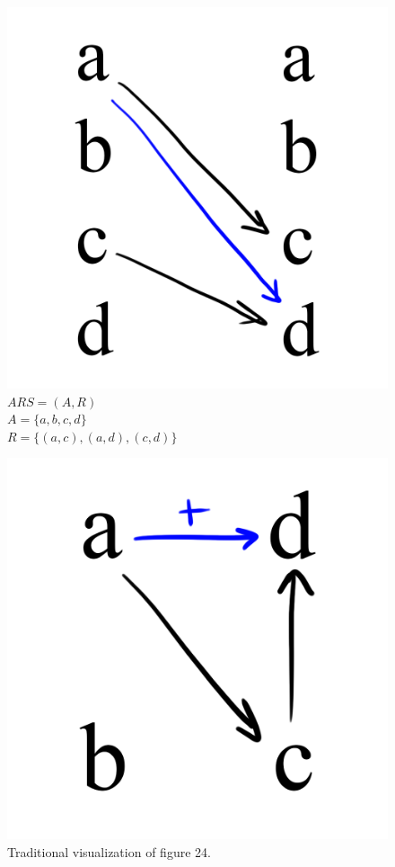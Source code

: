 \documentclass{article}
\begin{document}
\begin{figure}[H]
  \centering
  \includegraphics[scale=0.06]{s5}
  \caption[] {
    $ARS = (A, R)$
    \\ $A = \{a, b, c ,d\}$
    \\ $R = \{(a, c), (a, d), (c, d)\}$
    \endtabular}
\end{figure}

\begin{figure}[H]
  \centering
  \includegraphics[scale=0.06]{v5}
  \caption[] {
    Traditional visualization of figure 24.
    \endtabular}
\end{figure}
\end{document}
